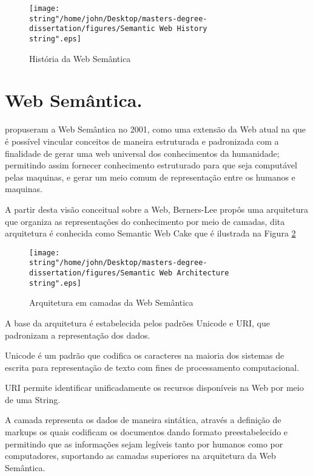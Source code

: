 \begin{figure}
\begin{centering}
\texttt{[image: \\string"/home/john/Desktop/masters-degree-dissertation/figures/Semantic Web History\\string".eps]}
\par\end{centering}
\caption{História da Web Semântica \label{fig:Semantic_Web_History}}
\end{figure}


\section{Web Semântica.}

\citet{bernerslee2001} propuseram a Web Semântica no 2001, como uma
extensão da Web atual na que é possível vincular conceitos de maneira
estruturada e padronizada com a finalidade de gerar uma web universal
dos conhecimentos da humanidade; permitindo assim fornecer conhecimento
estruturado para que seja computável pelas maquinas, e gerar um meio
comum de representação entre os humanos e maquinas.

A partir desta visão conceitual sobre a Web, Berners-Lee propôs uma
arquitetura que organiza as representações do conhecimento por meio
de camadas, dita arquitetura é conhecida como \foreignlanguage{english}{Semantic
Web Cake} que é ilustrada na Figura \ref{fig:Web-Semantic-Architecture}

\begin{figure}
\caption{Arquitetura em camadas da Web Semântica\label{fig:Web-Semantic-Architecture}}
\texttt{[image: \\string"/home/john/Desktop/masters-degree-dissertation/figures/Semantic Web Architecture\\string".eps]}
\end{figure}

A base da arquitetura é estabelecida pelos padrões \foreignlanguage{english}{Unicode}
e URI, que padronizam a representação dos dados. 

%
Unicode\foreignlanguage{brazil}{ é um padrão que codifica os caracteres
na maioria dos sistemas de escrita para representação de texto com
fines de processamento computacional.}

%
URI  permite identificar
unificadamente os recursos disponíveis na Web por meio de uma \foreignlanguage{english}{String.}

A camada  representa
os dados de maneira sintática, através a definição de \foreignlanguage{english}{markups}
os quais codificam os documentos dando formato preestabelecido e permitindo
que as informações sejam legíveis tanto por humanos como por computadores,
suportando as camadas superiores na arquitetura da Web Semântica.

